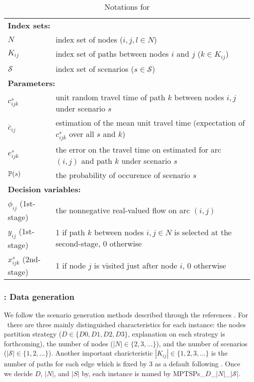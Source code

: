 \begin{table}[H]
	\caption{Notations for \mptsps}
	\label{mptsps:notation}
	\resizebox{\textwidth}{!}
	{
		\begin{tabular}{ll}
			\toprule
			\multicolumn{2}{l}{\textbf{Index sets:}} \\
			$N$ & \textrm{index set of nodes ($i,j,l\in N$)} \\ 
			$K_{ij}$ & \textrm{index set of paths between nodes $i$ and $j$ ($k\in K_{ij}$)} \\ 
			$\mathcal{S}$ & \textrm{index set of scenarios ($s\in \mathcal{S}$)}\\ \midrule
			\multicolumn{2}{l}{\textbf{Parameters:}} \\
			$c_{ijk}^{s}$ & \textrm{unit random travel time of path $k$ between nodes $i,j$ under scenario $s$} \\ 
			$\bar{c}_{ij}$ & \textrm{estimation of the mean unit travel time (expectation of $c_{ijk}^{s}$ over all $s$ and $k$)} \\ 
			$e_{ijk}^{s}$ & \textrm{the error on the travel time on estimated for arc $(i,j)$ and path $k$ under scenario $s$} \\ 
			$\operatorname*{\mathbb{P}}(s)$ & \textrm{the probability of occurence of scenario $s$} \\  \midrule
			\multicolumn{2}{l}{\textbf{Decision variables:}} \\
			$\phi_{ij}$ (1st-stage) & \textrm{the nonnegative real-valued flow on arc $(i,j)$}\\
			$y_{ij}$ (1st-stage)& \textrm{1 if path $k$ between nodes $i,j\in N$ is selected at the second-stage, 0 otherwise} \\  
			$x_{ijk}^{s}$ (2nd-stage) & \textrm{1 if node $j$ is visited just after node $i$, 0 otherwise} \\ 
			\bottomrule
		\end{tabular}
	}
\end{table} 


\subsubsection{\mptsps: Data generation}
We follow the scenario generation methods described through the references \cite{journal:MPT2014,journal:PGM2017,journal:TPP2017}. For \mptsps\, there are three mainly distinguished characteristics for each instance: the nodes partition strategy ($D\in\{D0,D1,D2,D3\}$, explanation on each strategy is forthcoming), the number of nodes ($|N|\in\{2,3,\ldots\}$), and the number of scenarios ($|\mathcal{S}|\in\{1,2,\ldots\}$). Another important charicteristic $|K_{ij}|\in\{1,2,3,\ldots\}$ is the number of paths for each edge which is fixed by 3 as a default following \cite{journal:TPP2017}. Once we decide $D$, $|N|$, and $|S|$ by, each instance is named by MPTSPs\_$D$\_$|N|$\_$|\mathcal{S}|$.

